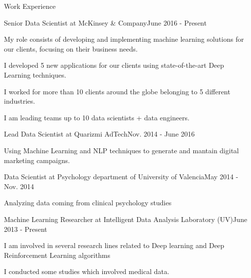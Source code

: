 \documentclass{resume} %
\begin{document}
\begin{rSection}{ Work Experience } \itemsep -1pt       
\begin{rSubsection}{Senior Data Scientist at McKinsey \& Company}{June 2016 - Present}{}    
    
    \vspace{-3pt}
    
    \item My role consists of developing and implementing machine learning solutions for our clients, focusing on their business needs.
    \item I developed 5 new applications for our clients using state-of-the-art Deep Learning techniques.
    \item I worked for more than 10 clients around the globe belonging to 5 different industries.
    \item I am leading teams up to 10 data scientists + data engineers.
\end{rSubsection} 

\vspace{-6pt}

\begin{rSubsection}{Lead Data Scientist at Quarizmi AdTech}{Nov. 2014 - June 2016}{}
    
    \vspace{-3pt}
    
    \item Using Machine Learning and NLP techniques to generate and mantain digital marketing campaigns.
\end{rSubsection} 

\vspace{-6pt}

\begin{rSubsection}{Data Scientist at Psychology department of University of Valencia}{May 2014 - Nov. 2014}{}

    \vspace{-3pt}
    
    \item Analyzing data coming from clinical psychology studies 

\end{rSubsection}

\vspace{-6pt}

\begin{rSubsection}{Machine Learning Researcher at Intelligent Data Analysis Laboratory (UV)}{June 2013 - Present}{}

    \vspace{-3pt}
    
    \item I am involved in several research lines related to Deep learning and Deep Reinforcement Learning algorithms
    \item I conducted some studies which involved medical data.

\end{rSubsection}

\end{rSection}
\end{document}
